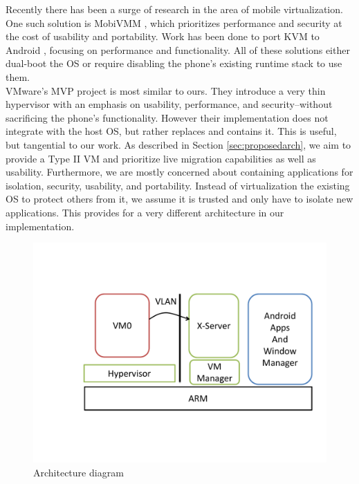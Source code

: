 Recently there has been a surge of research in the area of mobile virtualization.  One such solution is MobiVMM \cite{mobivmm}, which prioritizes performance and security at the cost of usability and portability.  Work has been done to port KVM to Android \cite{columbia}, focusing on performance and functionality.  All of these solutions either dual-boot the OS or require disabling the phone's existing runtime stack to use them. \\

VMware's MVP project \cite{mvp} is most similar to ours.  They introduce a very thin hypervisor with an emphasis on usability, performance, and security--without sacrificing the phone's functionality.   However their implementation does not integrate with the host OS, but rather replaces and contains it.  This is useful, but tangential to our work.  As described in Section \ref{sec:proposedarch}, we aim to provide a Type II VM and prioritize live migration capabilities as well as usability.  Furthermore, we are mostly concerned about containing applications for isolation, security, usability, and portability.  Instead of virtualization the existing OS to protect others from it, we assume it is trusted and only have to isolate new applications.  This provides for a very different architecture in our implementation. \\

\begin{figure}[tbh]
\centering
\includegraphics[width=1.0\columnwidth]{arch}
\caption{Architecture diagram}
\label{fig:arch}
\end{figure}

